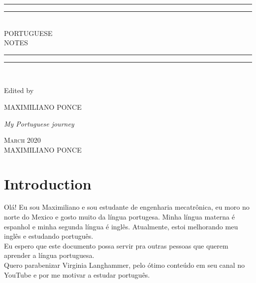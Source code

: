 \documentclass[10pt,a4paper]{article}
\newlength{\drop}
\begin{document}
\begin{titlepage}

\textheight
    \centering
    \vspace*{\baselineskip}
    \rule{\textwidth}{1.6pt}\vspace*{-\baselineskip}\vspace*{2pt}
    \rule{\textwidth}{0.6pt}\\[\baselineskip]
    {\LARGE PORTUGUESE\\[0.2\baselineskip] NOTES}\\[0.2\baselineskip]
    \rule{\textwidth}{0.4pt}\vspace*{-\baselineskip}\vspace{3.2pt}
    \rule{\textwidth}{1.6pt}\\[\baselineskip]
    \scshape

    \vspace*{2\baselineskip}
    Edited by \\[\baselineskip]
    {\Large MAXIMILIANO PONCE\par}
    {\itshape My Portuguese journey \\\par}
    \vfill
    {\scshape March 2020} \\
    {\large MAXIMILIANO PONCE}\par

\end{titlepage}

\tableofcontents
\newpage

\section{Introduction}
\indent
Olá! Eu sou Maximiliano e sou estudante de engenharia mecatrônica, eu moro no norte do Mexico e gosto muito da língua portugesa. Minha língua materna é espanhol e minha segunda língua é inglês. Atualmente, estoi melhorando meu inglês e estudando português. \\

\indent
Eu espero que este documento possa servir pra outras pessoas que querem aprender a língua portuguesa.\\

\indent
Quero parabenizar Virginia Langhammer, pelo ótimo conteúdo em seu canal no YouTube e por me motivar a estudar português.
\newpage
\end{document}
